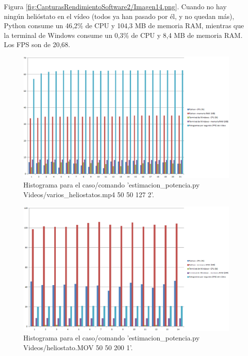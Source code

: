 Figura \ref{fig:CapturasRendimientoSoftware2/Imagen14.png}. Cuando no hay ningún helióstato en el vídeo (todos ya han pasado por él, y no quedan más), Python consume un 46,2\% de CPU y 104,3 MB de memoria RAM, mientras que la terminal de Windows consume un 0,3\% de CPU y 8,4 MB de memoria RAM. Los FPS son de 20,68.

\begin{figure}[h!]
  	\centering
	\includegraphics[width=\textwidth]{CapturasRendimientoSoftware1/GraficasRendimientoSoftware1.PNG}
	\caption{Histograma para el caso/comando 'estimacion\_potencia.py Videos/varios\_heliostatos.mp4 50 50 127 2'.
	\label{fig:CapturasRendimientoSoftware1/GraficasRendimientoSoftware1.PNG}}
\end{figure}

\begin{figure}[h!]
  	\centering
	\includegraphics[width=\textwidth]{CapturasRendimientoSoftware2/GraficasRendimientoSoftware2.PNG}
	\caption{Histograma para el caso/comando 'estimacion\_potencia.py Videos/heliostato.MOV 50 50 200 1'.
	\label{fig:CapturasRendimientoSoftware2/GraficasRendimientoSoftware2.PNG}}
\end{figure}

